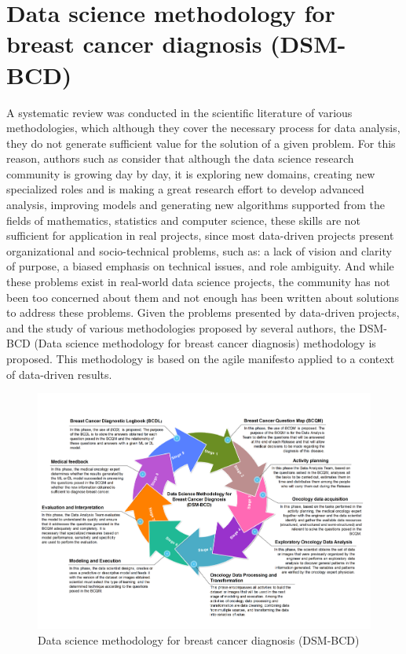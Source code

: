 \section{Data science methodology for breast cancer diagnosis (DSM-BCD)}
A systematic review was conducted in the scientific literature of various methodologies, which although they cover the necessary process for data analysis, they do not generate sufficient value for the solution of a given problem. For this reason, authors such as \cite{Martinez2021} consider that although the data science research community is growing day by day, it is exploring new domains, creating new specialized roles and is making a great research effort to develop advanced analysis, improving models and generating new algorithms supported from the fields of mathematics, statistics and computer science, these skills are not sufficient for application in real projects, since most data-driven projects present organizational and socio-technical problems, such as: a lack of vision and clarity of purpose, a biased emphasis on technical issues, and role ambiguity. And while these problems exist in real-world data science projects, the community has not been too concerned about them and not enough has been written about solutions to address these problems. Given the problems presented by data-driven projects, and the study of various methodologies proposed by several authors, the DSM-BCD (Data science methodology for breast cancer diagnosis) methodology is proposed. This methodology is based on the agile manifesto applied to a context of data-driven results. 

\begin{figure}
	\centering
	\includegraphics[width=0.9
	\linewidth]{IMAGES/DSM-BCD.pdf}
	\caption{Data science methodology for breast cancer diagnosis (DSM-BCD)}
	\label{DSM-BCD}
\end{figure}

